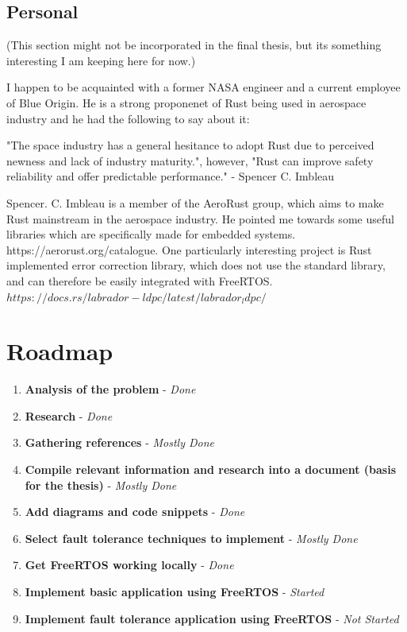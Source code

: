\documentclass[12pt, letterpaper]{article}
\begin{document}
\subsection{Personal}

(This section might not be incorporated in the final thesis, but its something interesting I am keeping here for now.)

I happen to be acquainted with a former NASA engineer and a current employee of Blue Origin. He is a strong proponenet of Rust being used in aerospace industry and he had the following to say about it:

"The space industry has a general hesitance to adopt Rust due to perceived newness and lack of industry maturity.", however, "Rust can improve safety reliability and offer predictable performance." 
- Spencer C. Imbleau

Spencer. C. Imbleau is a member of the AeroRust group, which aims to make Rust mainstream in the aerospace industry. He pointed me towards some useful libraries which are specifically made for embedded systems. https://aerorust.org/catalogue. One particularly interesting project is Rust implemented error correction library, which does not use the standard library, and can therefore be easily integrated with FreeRTOS. \(https://docs.rs/labrador-ldpc/latest/labrador_ldpc/\)

\newpage

\section{Roadmap}

\begin{enumerate}[label=\arabic*.]
    \item \textbf{Analysis of the problem} - \textit{Done}
    \item \textbf{Research} - \textit{Done}
    \item \textbf{Gathering references} - \textit{Mostly Done}
    \item \textbf{Compile relevant information and research into a document (basis for the thesis)} - \textit{Mostly Done}
    \item \textbf{Add diagrams and code snippets} - \textit{Done}
    \item \textbf{Select fault tolerance techniques to implement} - \textit{Mostly Done}
    \item \textbf{Get FreeRTOS working locally} - \textit{Done}
    \item \textbf{Implement basic application using FreeRTOS} - \textit{Started}
    \item \textbf{Implement fault tolerance application using FreeRTOS} - \textit{Not Started}
\end{enumerate}

\newpage
\printbibliography
\end{document}
